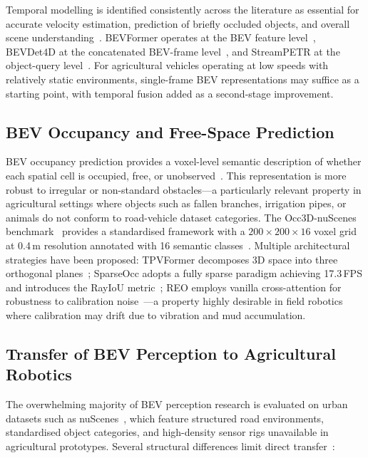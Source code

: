 \documentclass[12pt, a4paper]{article}
\begin{document}
Temporal modelling is identified consistently across the literature as essential for
accurate velocity estimation, prediction of briefly occluded objects, and overall scene
understanding~\cite{ref16, ref17}. BEVFormer operates at the BEV feature
level~\cite{ref48, ref49}, BEVDet4D at the concatenated BEV-frame
level~\cite{ref14, ref16, ref18}, and StreamPETR at the object-query
level~\cite{ref4, ref8, ref14, ref17}. For agricultural vehicles operating at low speeds with
relatively static environments, single-frame BEV representations may suffice as a starting
point, with temporal fusion added as a second-stage improvement.

\subsection{BEV Occupancy and Free-Space Prediction}

BEV occupancy prediction provides a voxel-level semantic description of whether each
spatial cell is occupied, free, or unobserved~\cite{ref19, ref22}. This representation is
more robust to irregular or non-standard obstacles---a particularly relevant property in
agricultural settings where objects such as fallen branches, irrigation pipes, or animals
do not conform to road-vehicle dataset categories. The Occ3D-nuScenes
benchmark~\cite{ref39, ref40, ref41} provides a standardised framework with a
$200\!\times\!200\!\times\!16$ voxel grid at 0.4\,m resolution annotated with 16 semantic
classes~\cite{ref40}. Multiple architectural strategies have been proposed: TPVFormer
decomposes 3D space into three orthogonal planes~\cite{ref9, ref19}; SparseOcc adopts a
fully sparse paradigm achieving 17.3\,FPS and introduces the RayIoU metric~\cite{ref24};
REO employs vanilla cross-attention for robustness to calibration noise~\cite{ref26}---a
property highly desirable in field robotics where calibration may drift due to vibration
and mud accumulation.

\subsection{Transfer of BEV Perception to Agricultural Robotics}

The overwhelming majority of BEV perception research is evaluated on urban datasets such
as nuScenes~\cite{ref39, ref41}, which feature structured road environments,
standardised object categories, and high-density sensor rigs unavailable in agricultural
prototypes. Several structural differences limit direct transfer~\cite{ref2}:
\end{document}
